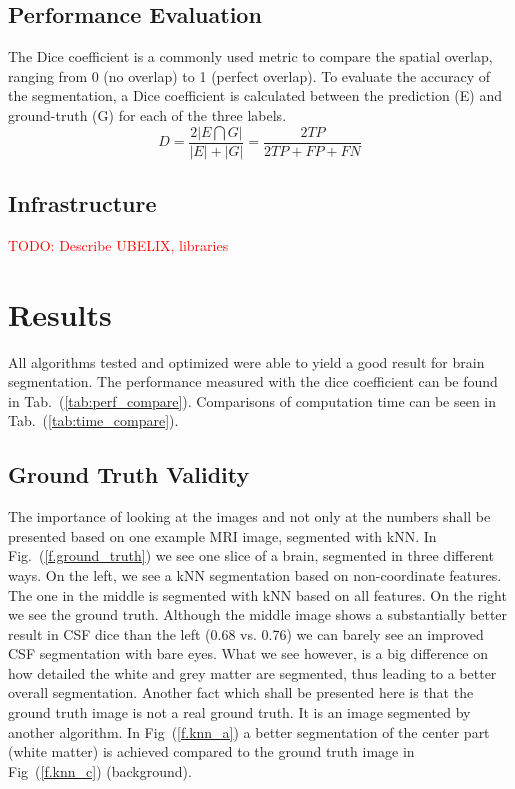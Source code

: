 \documentclass[journal]{IEEEtran}
\newcommand\TODO[1]{\textcolor{red}{TODO: #1}}
\begin{document}
\subsection{Performance Evaluation}\label{ch.eval}
The Dice coefficient is a commonly used metric to compare the spatial overlap, ranging from 0 (no overlap) to 1 (perfect overlap). To evaluate the accuracy of the segmentation, a Dice coefficient is calculated between the prediction (E) and ground-truth (G) for each of the three labels. 
\begin{equation}
D = \frac{2|E \bigcap G|}{|E| + |G|} = \frac{2 TP}{2 TP + FP + FN}
\end{equation}

\subsection{Infrastructure}
\TODO{Describe UBELIX, libraries}


\section{Results}
All algorithms tested and optimized were able to yield a good result for brain segmentation. The performance measured with the dice coefficient can be found in Tab.~(\ref{tab:perf_compare}). Comparisons of computation time can be seen in Tab.~(\ref{tab:time_compare}).\\

\subsection{Ground Truth Validity}

The importance of looking at the images and not only at the numbers shall be presented based on one example MRI image, segmented with kNN. In Fig.~(\ref{f.ground_truth}) we see one slice of a brain, segmented in three different ways. On the left, we see a kNN segmentation based on non-coordinate features. The one in the middle is segmented with kNN based on all features. On the right we see the ground truth. Although the middle image shows a substantially better result in CSF dice than the left (0.68 vs. 0.76) we can barely see an improved CSF segmentation with bare eyes. What we see however, is a big difference on how detailed the white and grey matter are segmented, thus leading to a better overall segmentation. Another fact which shall be presented here is that the ground truth image is not a real ground truth. It is an image segmented by another algorithm. In Fig~(\ref{f.knn_a}) a better segmentation of the center part (white matter) is achieved compared to the ground truth image in Fig~(\ref{f.knn_c}) (background).
\end{document}
